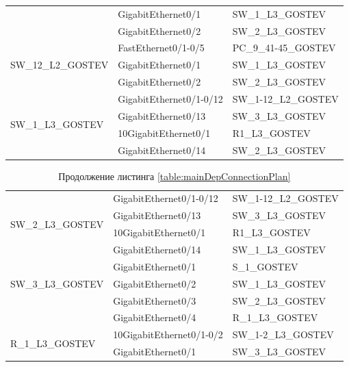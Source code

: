 \documentclass[14pt, a4paper]{extarticle}
\numberwithin{equation}{section}
\begin{document}
\begin{table}[H]
\begin{tabular}{|l|l|l|}
                                    & GigabitEthernet0/1       & SW\_1\_L3\_GOSTEV             \\ \cline{2-3} 
                                    & GigabitEthernet0/2       & SW\_2\_L3\_GOSTEV             \\ \hline
\multirow{3}{*}{SW\_12\_L2\_GOSTEV} & FastEthernet0/1-0/5      & PC\_9\_41-45\_GOSTEV          \\ \cline{2-3} 
                                    & GigabitEthernet0/1       & SW\_1\_L3\_GOSTEV             \\ \cline{2-3} 
                                    & GigabitEthernet0/2       & SW\_2\_L3\_GOSTEV             \\ \hline
\multirow{4}{*}{SW\_1\_L3\_GOSTEV}  & GigabitEthernet0/1-0/12  & SW\_1-12\_L2\_GOSTEV          \\ \cline{2-3} 
                                    & GigabitEthernet0/13      & SW\_3\_L3\_GOSTEV             \\ \cline{2-3} 
                                    & 10GigabitEthernet0/1     & R1\_L3\_GOSTEV                \\ \cline{2-3} 
                                    & GigabitEthernet0/14      & SW\_2\_L3\_GOSTEV             \\ 
\end{tabular}
\end{table}

\newpage
\begin{table}[H]
\small
\centering
\caption*{Продолжение листинга \ref{table:mainDepConnectionPlan}}
\begin{tabular}{|l|l|l|}
\hline
\multirow{4}{*}{SW\_2\_L3\_GOSTEV}  & GigabitEthernet0/1-0/12  & SW\_1-12\_L2\_GOSTEV          \\ \cline{2-3} 
                                    & GigabitEthernet0/13      & SW\_3\_L3\_GOSTEV             \\ \cline{2-3} 
                                    & 10GigabitEthernet0/1     & R1\_L3\_GOSTEV                \\ \cline{2-3} 
                                    & GigabitEthernet0/14      & SW\_1\_L3\_GOSTEV             \\ \hline
\multirow{3}{*}{SW\_3\_L3\_GOSTEV}  & GigabitEthernet0/1       & S\_1\_GOSTEV                  \\ \cline{2-3} 
                                    & GigabitEthernet0/2       & SW\_1\_L3\_GOSTEV             \\ \cline{2-3} 
                                    & GigabitEthernet0/3       & SW\_2\_L3\_GOSTEV             \\ \cline{2-3}
                                    & GigabitEthernet0/4       & R\_1\_L3\_GOSTEV              \\ \hline
\multirow{2}{*}{R\_1\_L3\_GOSTEV}   & 10GigabitEthernet0/1-0/2 & SW\_1-2\_L3\_GOSTEV           \\ \cline{2-3} 
                                    & GigabitEthernet0/1       & SW\_3\_L3\_GOSTEV             \\ \hline
\end{tabular}
\end{table}
\end{document}
